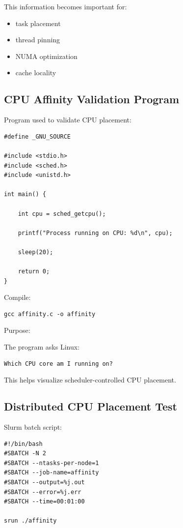 \documentclass[11pt]{article}
\begin{document}
This information becomes important for:

\begin{itemize}
\item task placement
\item thread pinning
\item NUMA optimization
\item cache locality
\end{itemize}
\subsection{CPU Affinity Validation Program}
\label{sec:orgbe7d931}

Program used to validate CPU placement:

\begin{verbatim}
#define _GNU_SOURCE

#include <stdio.h>
#include <sched.h>
#include <unistd.h>

int main() {

    int cpu = sched_getcpu();

    printf("Process running on CPU: %d\n", cpu);

    sleep(20);

    return 0;
}
\end{verbatim}

Compile:

\begin{verbatim}
gcc affinity.c -o affinity
\end{verbatim}

Purpose:

The program asks Linux:

\begin{verbatim}
Which CPU core am I running on?
\end{verbatim}

This helps visualize scheduler-controlled CPU placement.
\subsection{Distributed CPU Placement Test}
\label{sec:org00b7e12}

Slurm batch script:

\begin{verbatim}
#!/bin/bash
#SBATCH -N 2
#SBATCH --ntasks-per-node=1
#SBATCH --job-name=affinity
#SBATCH --output=%j.out
#SBATCH --error=%j.err
#SBATCH --time=00:01:00

srun ./affinity
\end{verbatim}
\end{document}
